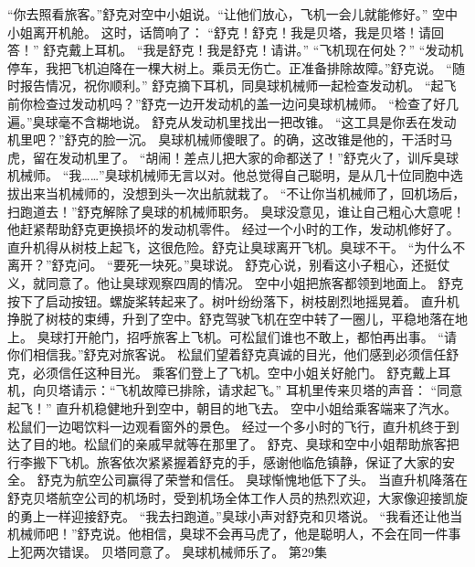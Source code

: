 \documentclass[a4paper,12pt,UTF8,twoside]{ctexbook}
\begin{document}
        “你去照看旅客。”舒克对空中小姐说。“让他们放心，飞机一会儿就能修好。” 
        空中小姐离开机舱。 
        这时，话筒响了： 
        “舒克！舒克！我是贝塔，我是贝塔！请回答！” 
        舒克戴上耳机。 
        “我是舒克！我是舒克！请讲。” 
        “飞机现在何处？” 
        “发动机停车，我把飞机迫降在一棵大树上。乘员无伤亡。正准备排除故障。”舒克说。 
        “随时报告情况，祝你顺利。” 
        舒克摘下耳机，同臭球机械师一起检查发动机。 
        “起飞前你检查过发动机吗？”舒克一边开发动机的盖一边问臭球机械师。 
        “检查了好几遍。”臭球毫不含糊地说。 
        舒克从发动机里找出一把改锥。 
        “这工具是你丢在发动机里吧？”舒克的脸一沉。 
        臭球机械师傻眼了。的确，这改锥是他的，干活时马虎，留在发动机里了。 
        “胡闹！差点儿把大家的命都送了！”舒克火了，训斥臭球机械师。 
        “我……”臭球机械师无言以对。他总觉得自己聪明，是从几十位同胞中选拔出来当机械师的，没想到头一次出航就栽了。 
        “不让你当机械师了，回机场后，扫跑道去！”舒克解除了臭球的机械师职务。 
        臭球没意见，谁让自己粗心大意呢！他赶紧帮助舒克更换损坏的发动机零件。 
        经过一个小时的工作，发动机修好了。 
        直升机得从树枝上起飞，这很危险。舒克让臭球离开飞机。臭球不干。 
        “为什么不离开？”舒克问。 
        “要死一块死。”臭球说。 
        舒克心说，别看这小子粗心，还挺仗义，就同意了。他让臭球观察四周的情况。 
        空中小姐把旅客都领到地面上。 
        舒克按下了启动按钮。螺旋桨转起来了。树叶纷纷落下，树枝剧烈地摇晃着。 
        直升机挣脱了树枝的束缚，升到了空中。舒克驾驶飞机在空中转了一圈儿，平稳地落在地上。 
        臭球打开舱门，招呼旅客上飞机。可松鼠们谁也不敢上，都怕再出事。 
        “请你们相信我。”舒克对旅客说。 
        松鼠们望着舒克真诚的目光，他们感到必须信任舒克，必须信任这种目光。 
        乘客们登上了飞机。空中小姐关好舱门。 
        舒克戴上耳机，向贝塔请示：“飞机故障已排除，请求起飞。” 
        耳机里传来贝塔的声音： 
        “同意起飞！” 
        直升机稳健地升到空中，朝目的地飞去。 
        空中小姐给乘客端来了汽水。松鼠们一边喝饮料一边观看窗外的景色。 
        经过一个多小时的飞行，直升机终于到达了目的地。松鼠们的亲戚早就等在那里了。 
        舒克、臭球和空中小姐帮助旅客把行李搬下飞机。旅客依次紧紧握着舒克的手，感谢他临危镇静，保证了大家的安全。 
        舒克为航空公司赢得了荣誉和信任。 
        臭球惭愧地低下了头。 
        当直升机降落在舒克贝塔航空公司的机场时，受到机场全体工作人员的热烈欢迎，大家像迎接凯旋的勇上一样迎接舒克。 
        “我去扫跑道。”臭球小声对舒克和贝塔说。 
        “我看还让他当机械师吧！”舒克说。他相信，臭球不会再马虎了，他是聪明人，不会在同一件事上犯两次错误。 
        贝塔同意了。 
        臭球机械师乐了。   第29集 
\end{document}
